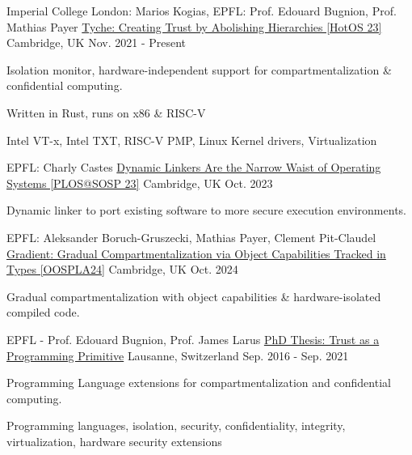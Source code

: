 \begin{cventries}

\cventry
{Imperial College London: Marios Kogias, EPFL: Prof. Edouard Bugnion, Prof. Mathias Payer}
  {\href{https://aghosn.github.io/assets/pdf/tyche_aghosn.pdf}{Tyche: Creating Trust by Abolishing Hierarchies [HotOS 23]}}
{Cambridge, UK}
{Nov. 2021 - Present}
{ %
	\begin{cvitems}
  \item{Isolation monitor, hardware-independent support for compartmentalization \& confidential computing.}
  \item{Written in Rust, runs on x86 \& RISC-V}
  \item{Intel VT-x, Intel TXT, RISC-V PMP, Linux Kernel drivers, Virtualization}
	\end{cvitems}
}

\cventry
{EPFL: Charly Castes}
  {\href{https://dl.acm.org/doi/abs/10.1145/3623759.3624548}{Dynamic Linkers Are the Narrow Waist of Operating Systems [PLOS@SOSP 23]}}
{Cambridge, UK}
{Oct. 2023}
{ 
	\begin{cvitems}
  \item{Dynamic linker to port existing software to more secure execution environments.}
	\end{cvitems}
}

\cventry
{EPFL: 	Aleksander Boruch-Gruszecki, Mathias Payer, Clement Pit-Claudel}
  {\href{https://dl.acm.org/doi/10.1145/3689751}{Gradient: Gradual Compartmentalization via Object Capabilities Tracked in Types [OOSPLA24]}}
{Cambridge, UK}
{Oct. 2024}
{ 
	\begin{cvitems}
  \item{Gradual compartmentalization with object capabilities \& hardware-isolated compiled code.}
	\end{cvitems}
}



\cventry
{EPFL - Prof. Edouard Bugnion, Prof. James Larus}
  {\href{https://infoscience.epfl.ch/record/289120}{PhD Thesis: Trust as a Programming Primitive}}
{Lausanne, Switzerland}
{Sep. 2016  - Sep. 2021}
{
	\begin{cvitems}
  \item{Programming Language extensions for compartmentalization and confidential computing.}
  \item{Programming languages, isolation, security, confidentiality, integrity, virtualization, hardware security extensions}
	\end{cvitems}
}



\end{cventries}
